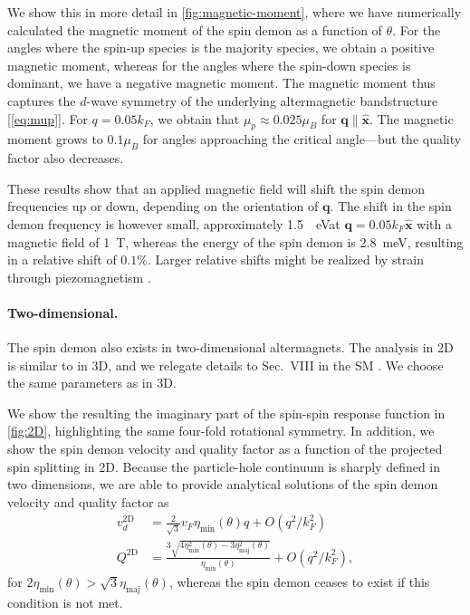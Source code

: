 \documentclass[aps,prl,reprint,twocolumns,superscriptaddress]{revtex4-2}
\newcommand{\xx}{\hat{\bm{x}}}
\newcommand{\kF}{k_{F}}
\newcommand{\vs}{v_d}
\newcommand{\muB}{0.025}
\newcommand{\muBShift}{\SI{1.5}{\mu eV}}
\newcommand{\demonenergy}{\SI{2.8}{meV}}
\newcommand{\muBShiftrelative}{0.1}
\newcommand{\muBmax}{0.1}
\begin{document}
	We show this in more detail in \cref{fig:magnetic-moment}, where we have numerically calculated the magnetic moment of the spin demon as a function of $\theta$. For the angles where the spin-up species is the majority species, we obtain a positive magnetic moment, whereas for the angles where the spin-down species is dominant, we have a negative magnetic moment. The magnetic moment thus captures the $d$-wave symmetry of the underlying altermagnetic bandstructure [\cref{eq:mup}]. For $q=0.05\kF$, we obtain that $\mu_p\approx\muB\mu_B$ for $\bm q\parallel \xx$. The magnetic moment grows to $\muBmax\mu_B$ for angles approaching the critical angle---but the quality factor also decreases. 
	
	These results show that an applied magnetic field will shift the spin demon frequencies up or down, depending on the orientation of $\bm q$. The shift in the spin demon frequency is however small, approximately \muBShift at $\bm q=0.05k_F\hat{\bm x}$ with a magnetic field of \SI{1}{T}, whereas the energy of the spin demon is \demonenergy, resulting in a relative shift of $\muBShiftrelative\%$. Larger relative shifts might be realized by strain through piezomagnetism \cite{aoyamaPiezomagneticPropertiesAltermagnetic2024}.
	
	
	
	
	\paragraph{Two-dimensional.}
	The spin demon also exists in two-dimensional altermagnets. The analysis in 2D is similar to in 3D, and we relegate details to Sec.~VIII in the SM \cite{Note1}. We choose the same parameters as in 3D.
	
	We show the resulting the imaginary part of the spin-spin response function in \cref{fig:2D}, highlighting the same four-fold rotational symmetry. 
	In addition, we show the spin demon velocity and quality factor as a function of the projected spin splitting in 2D. Because the particle-hole continuum is sharply defined in two dimensions,  we are able to provide analytical solutions of the spin demon velocity and quality factor as \cite{agarwalLonglivedSpinPlasmons2014}
	\begin{align}
		\vs^{\mathrm{2D}} &= \frac{2}{\sqrt{3}} v_F \eta_{\mathrm{min}}(\theta) q + O(q^2/\kF^2)\\
		Q^{\mathrm{2D}} &= \frac{3\sqrt{4\eta_{\mathrm{min}}^2(\theta)-3\eta_{\mathrm{maj}}^2(\theta)}}{\eta_{\mathrm{min}}(\theta)} + O(q^2/\kF^2),
	\end{align}
	for $2\eta_{\mathrm{min}}(\theta)>\sqrt{3}\eta_{\mathrm{maj}}(\theta)$, whereas the spin demon ceases to exist if this condition is not met. 
	
\end{document}
